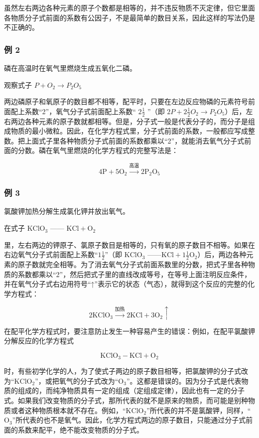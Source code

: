 虽然左右两边各种元素的原子个数都是相等的，并不违反物质不灭定律，但它里面各物质分子式前面的系数有公因子，不是最简单的数目关系，因此这样的写法仍是不正确的。

\subsubsection{例 2}

磷在高温时在氧气里燃烧生成五氧化二磷。

观察式子 \(P + O_{2} \longrightarrow P_{2}O_{5}\)

两边磷原子和氧原子的数目都不相等，配平时，只要在左边反应物磷的元素符号前面配上系数``2''，氧气分子式前面配上系数``
\(2\frac{1}{2}\) ''（即
\(2P+2\frac{1}{2}O_{2}\longrightarrow P_{2}O_{5}\)）后，左右两边各种元素的原子数就都相等。但是，分子式一般是代表分子的，而分子是组成物质的最小微粒。因此，在化学方程式里，分子式前面的系数，一般都应写成整数。把上面式子里各种物质分子式前面的系数都乘以``2''，就能消去氧气分子式前面的分数。磷在氧气里燃烧的化学方程式的完整写法是：

\[
4 \mathrm{P} + 5 \mathrm{O}_{2} \xrightarrow {\text{高温}} 2 \mathrm{P}_{2} \mathrm{O}_{5}
\]

\subsubsection{例 3}

氯酸钾加热分解生成氯化钾并放出氧气。

在式子 \(\mathrm{KClO}_3\) ------ \(\mathrm{KCl} + \mathrm{O}_2\)

里，左右两边的钾原子、氯原子数目是相等的，只有氧的原子数目不相等。如果在右边氧气分子式前面配上系数``\(1\frac{1}{2}\)''（即
\(\mathrm{KClO}_3\)
------\(\mathrm{KCl} + 1\frac{1}{2}\mathrm{O}_2\)）后，两边各种元素的原子数就完全相等。为了消去氧气分子式前面系数里的分数，把式子里各种物质的系数都乘以``2''，然后把式子里的直线改成等号，在等号上面注明反应条件，并在氧气分子式右边用符号``↑''表示它的状态（气态），就得到这个反应的完整的化学方程式：

\[
2 \mathrm{KClO}_{3} \xrightarrow {\text{加热}} 2 \mathrm{KCl} + 3 \mathrm{O}_{2} \uparrow
\]

在配平化学方程式时，要注意防止发生一种容易产生的错误：例如，在配平氯酸钾分解反应的化学方程式

\[
\mathrm{KClO}_{3} - \mathrm{KCl} + \mathrm{O}_{2}
\]

时，有些初学化学的人，为了使式子两边的原子数目相等，把氯酸钾的分子式改为``\(\mathrm{KClO}_{2}\)''，或把氧气的分子式改为``\(\mathrm{O}_{3}\)''。这都是错误的。因为分子式是代表物质的组成的，而纯净物质具有一定的组成（定组成定律），因此也有一定的分子式。如果我们改变物质的分子式，那所代表的就不是原来的物质，而可能是别种物质或者这种物质根本就不存在。例如，``\(\mathrm{KClO}_{2}\)''所代表的并不是氯酸钾，同样，``\(\mathrm{O}_{3}\)''所代表的也不是氧气。因此，化学方程式两边的原子数目，只能通过分子式前面的系数来配平，绝不能改变物质的分子式。

